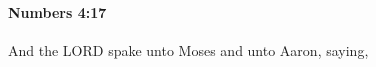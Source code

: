 
		\paragraph{Numbers 4:17} %
			\label{NUMBERS-4-17}

			And the LORD spake unto Moses and unto Aaron, saying,


